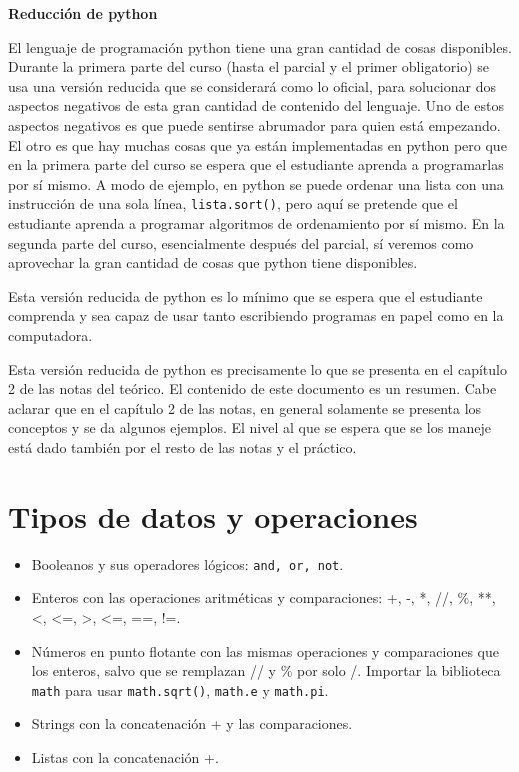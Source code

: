\documentclass[a4paper, 12pt]{article}
\theoremstyle{definition}
\begin{document}
\centerline{\Huge\bf Reducción de python}

\vspace{2em}

El lenguaje de programación python tiene una gran cantidad de cosas disponibles. Durante la primera parte del curso (hasta el parcial y el primer obligatorio) se usa una versión reducida que se considerará como lo oficial, para solucionar dos aspectos negativos de esta gran cantidad de contenido del lenguaje. Uno de estos aspectos negativos es que puede sentirse abrumador para quien está empezando. El otro es que hay muchas cosas que ya están implementadas en python pero que en la primera parte del curso se espera que el estudiante aprenda a programarlas por sí mismo. A modo de ejemplo, en python se puede ordenar una lista con una instrucción de una sola línea, {\tt lista.sort()}, pero aquí se pretende que el estudiante aprenda a programar algoritmos de ordenamiento por sí mismo. En la segunda parte del curso, esencialmente después del parcial, sí veremos como aprovechar la gran cantidad de cosas que python tiene disponibles.

Esta versión reducida de python es lo mínimo que se espera que el estudiante comprenda y sea capaz de usar tanto escribiendo programas en papel como en la computadora.

Esta versión reducida de python es precisamente lo que se presenta en el capítulo 2 de las notas del teórico. El contenido de este documento es un resumen. Cabe aclarar que en el capítulo 2 de las notas, en general solamente se presenta los conceptos y se da algunos ejemplos. El nivel al que se espera que se los maneje está dado también por el resto de las notas y el práctico.


\section{Tipos de datos y operaciones}
\begin{itemize}
	\item Booleanos y sus operadores lógicos: {\tt and, or, not}.
	\item Enteros con las operaciones aritméticas y comparaciones:
	+, -, *, //, \%, **, <, <=, >, <=, ==, !=.
	\item Números en punto flotante con las mismas operaciones y comparaciones que los enteros, salvo que se remplazan // y \% por solo /. Importar la biblioteca {\tt math} para usar {\tt math.sqrt()}, {\tt math.e} y {\tt math.pi}.
	\item Strings con la concatenación + y las comparaciones.
	\item Listas con la concatenación +.
\end{itemize}
\end{document}
